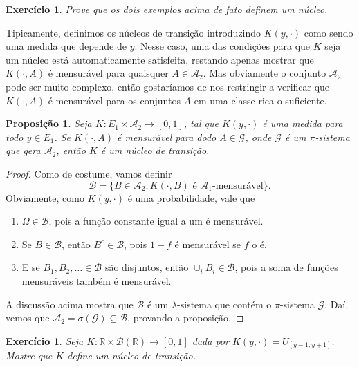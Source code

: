 \documentclass[reqno, draft]{book}
\newcommand*\1{\mathds{1}}
\newtheorem{proposition}[theorem]{Proposição}
\newtheorem{exercise}[example]{Exercício}
\begin{document}
\begin{exercise}
  Prove que os dois exemplos acima de fato definem um núcleo.
\end{exercise}

Tipicamente, definimos os núcleos de transição introduzindo $K(y, \cdot)$ como sendo uma medida que depende de $y$.
Nesse caso, uma das condições para que $K$ seja um núcleo está automaticamente satisfeita, restando apenas mostrar que $K(\cdot, A)$ é mensurável para quaisquer $A \in \mathcal{A}_2$.
Mas obviamente o conjunto $\mathcal{A}_2$ pode ser muito complexo, então gostaríamos de nos restringir a verificar que $K(\cdot, A)$ é mensurável para os conjuntos $A$ em uma classe rica o suficiente.

\begin{proposition}
  \label{p:K_nucleo_na_classe}
  Seja $K:E_1 \times \mathcal{A}_2 \to [0,1]$, tal que $K(y, \cdot)$ é uma medida para todo $y \in E_1$.
  Se $K(\cdot, A)$ é mensurável para dodo $A \in \mathcal{G}$, onde $\mathcal{G}$ é um $\pi$-sistema que gera $\mathcal{A}_2$, então $K$ é um núcleo de transição.
\end{proposition}

\begin{proof}
  Como de costume, vamos definir
  \begin{equation}
    \mathcal{B} = \{B \in \mathcal{A}_2; K(\cdot, B) \text{ é $\mathcal{A}_1$-mensurável}\}.
  \end{equation}
  Obviamente, como $K(y, \cdot)$ é uma probabilidade, vale que
  \begin{enumerate}[\quad a)]
  \item $\Omega \in \mathcal{B}$, pois a função constante igual a um é mensurável.
  \item Se $B \in \mathcal{B}$, então $B^c \in \mathcal{B}$, pois $1 - f$ é mensurável se $f$ o é.
  \item E se $B_1, B_2, \dots \in \mathcal{B}$ são disjuntos, então $\cup_i B_i \in \mathcal{B}$, pois a soma de funções mensuráveis também é mensurável.
  \end{enumerate}

  A discussão acima mostra que $\mathcal{B}$ é um $\lambda$-sistema que contém o $\pi$-sistema $\mathcal{G}$.
  Daí, vemos que $\mathcal{A}_2 = \sigma(\mathcal{G}) \subseteq \mathcal{B}$, provando a proposição.
\end{proof}

\begin{exercise}
  Seja $K:\mathbb{R} \times \mathcal{B}(\mathbb{R}) \to [0,1]$ dada por $K(y, \cdot) = U_{[y - 1,y + 1]}$.
  Mostre que $K$ define um núcleo de transição.
\end{exercise}
\end{document}
